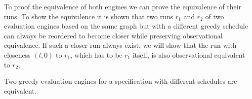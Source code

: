 To proof the equivalence of both engines we can prove the equivalence of their runs.
To show the equivalence it is shown that two runs \(r_1\) and \(r_2\) of two evaluation engines based on the same graph but with a different greedy schedule can always be reordered to become closer while preserving observational equivalence.
If such a closer run always exist, we will show that the run with closeness \((l, 0)\) to \(r_1\), which has to be \(r_1\) itself, is also observational equivalent to \(r_2\).

\begin{theorem}[name = Equivalence of Different Greedy Evaluation Engines]\label{theorem:equivalence_greedy_eval_engines}
  Two greedy evaluation engines for a specification with different schedules are equivalent.
\end{theorem}


